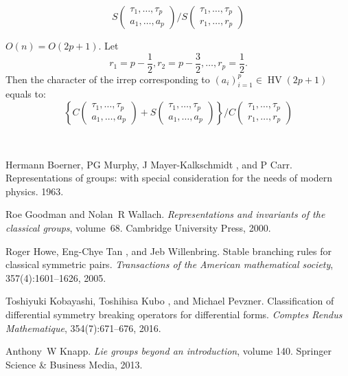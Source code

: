 \documentclass{article}
\newcommand{\tmop}[1]{\ensuremath{\operatorname{#1}}}
\newcommand{\tmtextit}[1]{{\itshape{#1}}}
\begin{document}
{\begin{description}
  \[ S \left( \begin{array}{c}
       \tau_1, \ldots, \tau_p\\
       a_1, \ldots, a_p
     \end{array} \right) / S \left( \begin{array}{c}
       \tau_1, \ldots, \tau_p\\
       r_1, \ldots, r_p
     \end{array} \right) \]
  \item[Case b] $O (n) = O (2 p + 1)$. Let
  \[ r_1 = p - \frac{1}{2}, r_2 = p - \frac{3}{2}, \ldots, r_p = \frac{1}{2} .
  \]
  Then the character of the irrep corresponding to $(a_i)_{i = 1}^p \in
  \tmop{HV} (2 p + 1)$ equals to:
  \[ \left\{ C \left( \begin{array}{c}
       \tau_1, \ldots, \tau_p\\
       a_1, \ldots, a_p
     \end{array} \right) + S \left( \begin{array}{c}
       \tau_1, \ldots, \tau_p\\
       a_1, \ldots, a_p
     \end{array} \right) \right\} / C \left( \begin{array}{c}
       \tau_1, \ldots, \tau_p\\
       r_1, \ldots, r_p
     \end{array} \right) \]
\end{description}}{\hspace*{\fill}}{\medskip}

\

\begin{thebibliography}{1}
  Hermann Boerner, PG Murphy, J
  Mayer-Kalkschmidt , and  P Carr.{\newblock} Representations of groups: with
  special consideration for the needs of modern physics.{\newblock}
  1963.{\newblock}
  
  Roe Goodman  and  Nolan~R
  Wallach.{\newblock} \tmtextit{Representations and invariants of the
  classical groups},  volume~68.{\newblock} Cambridge University Press,
  2000.{\newblock}
  
  Roger Howe, Eng-Chye Tan , and  Jeb
  Willenbring.{\newblock} Stable branching rules for classical symmetric
  pairs.{\newblock} \tmtextit{Transactions of the American mathematical
  society}, 357(4):1601--1626, 2005.{\newblock}
  
  Toshiyuki Kobayashi, Toshihisa Kubo
  , and  Michael Pevzner.{\newblock} Classification of differential symmetry
  breaking operators for differential forms.{\newblock} \tmtextit{Comptes
  Rendus Mathematique}, 354(7):671--676, 2016.{\newblock}
  
  Anthony~W Knapp.{\newblock} \tmtextit{Lie groups
  beyond an introduction},  volume  140.{\newblock} Springer Science \&
  Business Media, 2013.{\newblock}
\end{thebibliography}

\
\end{document}
